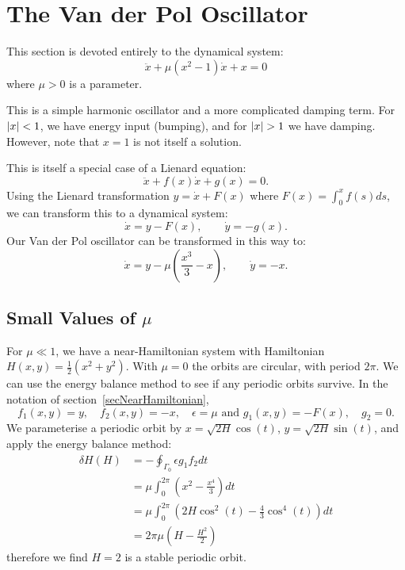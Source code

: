 \documentclass[../Main.tex]{subfiles}
\begin{document}
\section{The Van der Pol Oscillator}
This section is devoted entirely to the dynamical system:
\begin{equation}
    \ddot{x} + \mu (x^2 - 1) \dot{x} + x = 0
    \label{eqnVanDerPol}
\end{equation}
where $\mu > 0$ is a parameter.

This is a simple harmonic oscillator and a more complicated damping term. For $\left|x\right| < 1$, we have energy input (bumping), and for $\left|x\right| > 1$ we have damping. However, note that $x = 1$ is not itself a solution.

This is itself a special case of a Lienard equation:
\begin{equation*}
    \ddot{x} + f(x) \dot{x} + g(x) = 0.
\end{equation*}
Using the Lienard transformation $y = \dot{x} + F(x)$ where $F(x) = \int_{0}^{x} f(s) ds$, we can transform this to a dynamical system:
\begin{equation*}
    \dot{x} = y - F(x),\qquad \dot{y} = -g(x).
\end{equation*}
Our Van der Pol oscillator can be transformed in this way to:
\begin{equation}
    \dot{x} = y - \mu \left(\frac{x^3}{3} - x\right),\qquad \dot{y} = -x.
    \label{eqnVanDerPolDS}
\end{equation}
\subsection{Small Values of \texorpdfstring{$\mu$}{the Parameter}}
For $\mu \ll 1$, we have a near-Hamiltonian system with Hamiltonian $H(x, y) = \frac12(x^2 + y^2)$. With $\mu = 0$ the orbits are circular, with period $2\pi$. We can use the energy balance method to see if any periodic orbits survive. In the notation of section~\ref{secNearHamiltonian},
\begin{equation*}
    f_1(x, y) = y,\quad f_2(x, y) = -x,\quad \epsilon = \mu \text{ and } g_1(x, y) = -F(x),\quad g_2 = 0.
\end{equation*}
We parameterise a periodic orbit by $x = \sqrt{2H} \cos(t)$, $y = \sqrt{2H} \sin(t)$, and apply the energy balance method:
\begin{align*}
    \delta H(H) &= - \oint_{\Gamma_0} \epsilon g_1 f_2 dt \\
    &= \mu \int_{0}^{2\pi} \left(x^2 - \frac{x^4}{3}\right) dt \\
    &= \mu \int_{0}^{2\pi} \left(2H\cos^2(t) - \frac43 \cos^4(t)\right) dt \\
    &= 2\pi \mu \left(H - \frac{H^2}{2}\right)
\end{align*}
therefore we find $H = 2$ is a stable periodic orbit.
\end{document}
